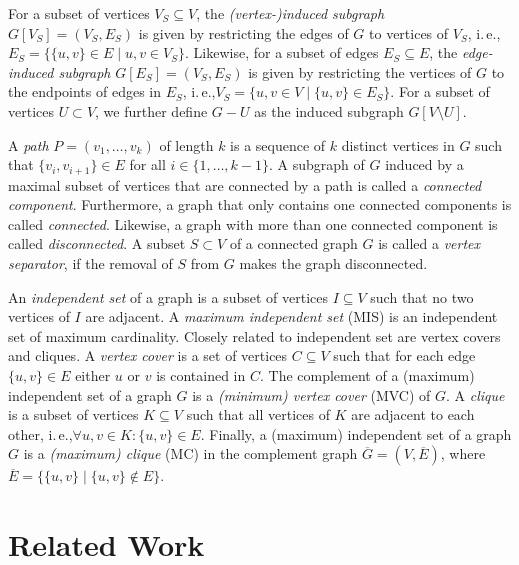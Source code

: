 \documentclass[a4paper,UKenglish,cleveref, autoref, thm-restate]{lipics-v2021}
\newcommand{\ie}{i.\,e.,\xspace}
\begin{document}
For a subset of vertices $V_S \subseteq V$, the \emph{(vertex-)induced subgraph}
$G[V_S] = (V_S, E_S)$ is given by restricting the edges of $G$ to vertices of $V_S$, \ie $E_S = \{\{u,v\} \in E \mid u,v \in V_S\}$.
Likewise, for a subset of edges $E_S \subseteq E$, the \emph{edge-induced
  subgraph} $G[E_S] = (V_S, E_S)$ is given by restricting the vertices of $G$ to the endpoints of edges in $E_S$, \ie $V_S = \{u,v \in V \mid \{u,v\} \in E_S\}$.
  For a subset of vertices $U \subset V$, we further define $G - U$ as the induced subgraph $G[V \setminus U]$.

A \emph{path} $P=(v_1, \ldots, v_k)$ of length $k$ is a sequence of $k$ distinct vertices in $G$ such that $\{v_i, v_{i+1}\} \in E$ for all $i \in \{1, \ldots, k-1\}$.
A subgraph of $G$ induced by a maximal subset of vertices that are connected by a path is called a \emph{connected component}.
Furthermore, a graph that only contains one connected components is called \emph{connected}.
Likewise, a graph with more than one connected component is called \emph{disconnected}.
A subset $S \subset V$ of a connected graph $G$ is called a \emph{vertex separator}, if the removal of $S$ from $G$ makes the graph disconnected.

An \emph{independent set} of a graph is a subset of vertices $I \subseteq V$ such that no two vertices of $I$ are adjacent. 
A \emph{maximum independent set} (MIS) is an independent set of maximum cardinality.
Closely related to independent set are vertex covers and cliques.
A \emph{vertex cover} is a set of vertices $C \subseteq V$ such that for each edge $\{u,v\} \in E$ either $u$ or $v$ is contained in $C$.
The complement of a (maximum) independent set of a graph $G$ is a \emph{(minimum) vertex cover} (MVC) of $G$.
A \emph{clique} is a subset of vertices $K \subseteq V$ such that all vertices of $K$ are adjacent to each other, \ie $\forall u,v \in K: \{u,v\} \in E$.
Finally, a (maximum) independent set of a graph $G$ is a \emph{(maximum) clique} (MC) in the complement graph $\overline{G} = (V, \overline{E})$, where $\overline{E} = \{\{u,v\} \mid \{u,v\} \not\in E\}$.

\section{Related Work}
\end{document}
